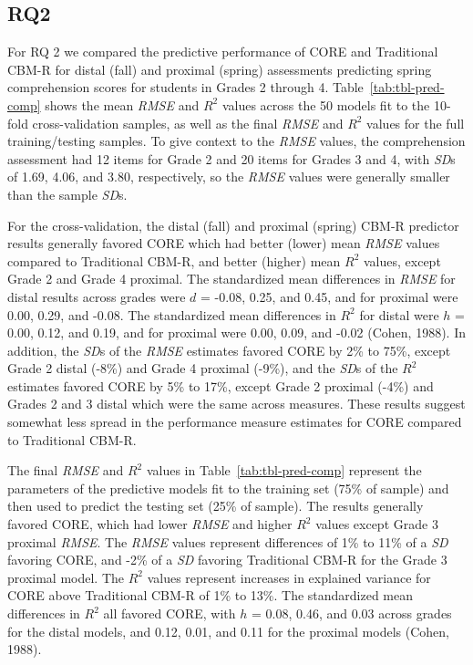 \documentclass[
  english,
  man, fleqn, noextraspace]{apa6}
\begin{document}
\begin{center}
\begin{ThreePartTable}
\end{ThreePartTable}
\end{center}

\hypertarget{rq2}{%
\subsection{RQ2}\label{rq2}}

For RQ 2 we compared the predictive performance of CORE and Traditional CBM-R for distal (fall) and proximal (spring) assessments predicting spring comprehension scores for students in Grades 2 through 4. Table~\ref{tab:tbl-pred-comp} shows the mean \emph{RMSE} and \(R^2\) values across the 50 models fit to the 10-fold cross-validation samples, as well as the final \emph{RMSE} and \(R^2\) values for the full training/testing samples. To give context to the \emph{RMSE} values, the comprehension assessment had 12 items for Grade 2 and 20 items for Grades 3 and 4, with \emph{SD}s of 1.69, 4.06, and 3.80, respectively, so the \emph{RMSE} values were generally smaller than the sample \emph{SD}s.

For the cross-validation, the distal (fall) and proximal (spring) CBM-R predictor results generally favored CORE which had better (lower) mean \emph{RMSE} values compared to Traditional CBM-R, and better (higher) mean \(R^2\) values, except Grade 2 and Grade 4 proximal. The standardized mean differences in \emph{RMSE} for distal results across grades were \(d\) = -0.08, 0.25, and 0.45, and for proximal were 0.00, 0.29, and -0.08. The standardized mean differences in \(R^2\) for distal were \(h\) = 0.00, 0.12, and 0.19, and for proximal were 0.00, 0.09, and -0.02 (Cohen, 1988). In addition, the \emph{SD}s of the \emph{RMSE} estimates favored CORE by 2\% to 75\%, except Grade 2 distal (-8\%) and Grade 4 proximal (-9\%), and the \emph{SD}s of the \(R^2\) estimates favored CORE by 5\% to 17\%, except Grade 2 proximal (-4\%) and Grades 2 and 3 distal which were the same across measures. These results suggest somewhat less spread in the performance measure estimates for CORE compared to Traditional CBM-R.

The final \emph{RMSE} and \(R^2\) values in Table~\ref{tab:tbl-pred-comp} represent the parameters of the predictive models fit to the training set (75\% of sample) and then used to predict the testing set (25\% of sample). The results generally favored CORE, which had lower \emph{RMSE} and higher \(R^2\) values except Grade 3 proximal \emph{RMSE}. The \emph{RMSE} values represent differences of 1\% to 11\% of a \emph{SD} favoring CORE, and -2\% of a \emph{SD} favoring Traditional CBM-R for the Grade 3 proximal model. The \(R^2\) values represent increases in explained variance for CORE above Traditional CBM-R of 1\% to 13\%. The standardized mean differences in \(R^2\) all favored CORE, with \(h\) = 0.08, 0.46, and 0.03 across grades for the distal models, and 0.12, 0.01, and 0.11 for the proximal models (Cohen, 1988).
\end{document}
